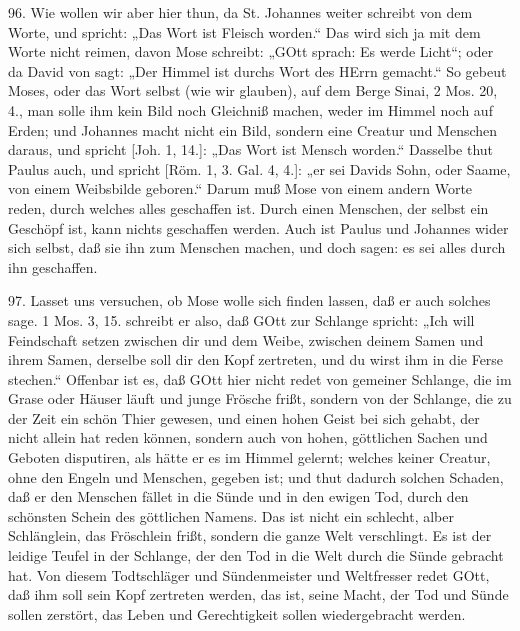 96. Wie wollen wir aber hier thun, da St. Johannes weiter schreibt von dem Worte, und spricht: „Das Wort ist Fleisch worden.“ Das wird sich ja mit dem Worte nicht reimen, davon Mose schreibt: „GOtt sprach: Es werde Licht“; oder da David von sagt: „Der Himmel ist durchs Wort des HErrn gemacht.“ So gebeut Moses, oder das Wort selbst (wie wir glauben), auf dem Berge Sinai, 2 Mos. 20, 4., man solle ihm kein Bild noch Gleichniß machen, weder im Himmel noch auf Erden; und Johannes macht nicht ein Bild, sondern eine Creatur und Menschen daraus, und spricht [Joh. 1, 14.]: „Das Wort ist Mensch worden.“ Dasselbe thut Paulus auch, und spricht [Röm. 1, 3. Gal. 4, 4.]: „er sei Davids Sohn, oder Saame, von einem Weibsbilde geboren.“ Darum muß Mose von einem andern Worte reden, durch welches alles geschaffen ist. Durch einen Menschen, der selbst ein Geschöpf ist, kann nichts geschaffen werden. Auch ist Paulus und Johannes wider sich selbst, daß sie ihn zum Menschen machen, und doch sagen: es sei alles durch ihn geschaffen.

97. Lasset uns versuchen, ob Mose wolle sich finden lassen, daß er auch solches sage. 1 Mos. 3, 15. schreibt er also, daß GOtt zur Schlange spricht: „Ich will Feindschaft setzen zwischen dir und dem Weibe, zwischen deinem Samen und ihrem Samen, derselbe soll dir den Kopf zertreten, und du wirst ihm in die Ferse stechen.“ Offenbar ist es, daß GOtt hier nicht redet von gemeiner Schlange, die im Grase oder Häuser
läuft und junge Frösche frißt, sondern von der Schlange, die zu der Zeit ein schön Thier gewesen, und einen hohen Geist bei sich gehabt, der nicht allein hat reden können, sondern auch von hohen, göttlichen Sachen und Geboten disputiren, als hätte er es im Himmel gelernt; welches keiner Creatur, ohne den Engeln und Menschen, gegeben ist; und thut dadurch solchen Schaden, daß er den Menschen fället in die Sünde und in den ewigen Tod, durch den schönsten Schein des göttlichen Namens. Das ist nicht ein schlecht, alber Schlänglein, das Fröschlein frißt, sondern die ganze Welt verschlingt. Es ist der leidige Teufel in der Schlange, der den Tod in die Welt durch die Sünde gebracht hat. Von diesem Todtschläger und Sündenmeister und Weltfresser redet GOtt, daß ihm soll sein Kopf zertreten werden, das ist, seine Macht, der Tod und Sünde sollen zerstört, das Leben und Gerechtigkeit sollen wiedergebracht werden.

